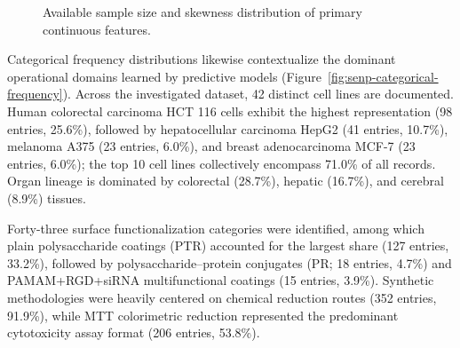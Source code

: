 \begin{figure}[H]
  \begin{minipage}{0.62\linewidth}
    \centering
  \end{minipage}
  \caption{Available sample size and skewness distribution of primary continuous features.}
  \label{fig:senp-continuous-summary}
\end{figure}

Categorical frequency distributions likewise contextualize the dominant operational domains learned by predictive models (Figure~\ref{fig:senp-categorical-frequency}). Across the investigated dataset, 42 distinct cell lines are documented. Human colorectal carcinoma HCT 116 cells exhibit the highest representation (98 entries, 25.6\%), followed by hepatocellular carcinoma HepG2 (41 entries, 10.7\%), melanoma A375 (23 entries, 6.0\%), and breast adenocarcinoma MCF-7 (23 entries, 6.0\%); the top 10 cell lines collectively encompass 71.0\% of all records. Organ lineage is dominated by colorectal (28.7\%), hepatic (16.7\%), and cerebral (8.9\%) tissues.

Forty-three surface functionalization categories were identified, among which plain polysaccharide coatings (PTR) accounted for the largest share (127 entries, 33.2\%), followed by polysaccharide--protein conjugates (PR; 18 entries, 4.7\%) and PAMAM+RGD+siRNA multifunctional coatings (15 entries, 3.9\%). Synthetic methodologies were heavily centered on chemical reduction routes (352 entries, 91.9\%), while MTT colorimetric reduction represented the predominant cytotoxicity assay format (206 entries, 53.8\%).

